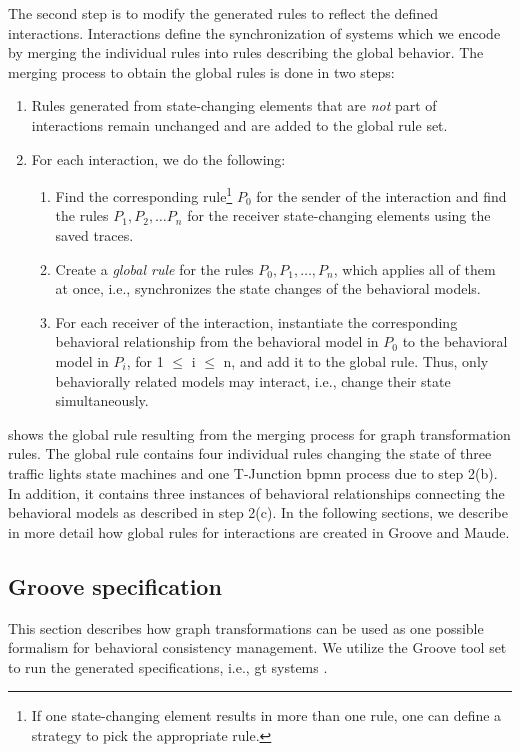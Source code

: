 \documentclass{jot}
\begin{document}
The second step is to modify the generated rules to reflect the defined interactions.
Interactions define the synchronization of systems which we encode by merging the individual rules into rules describing the global behavior.
The merging process to obtain the global rules is done in two steps:

\begin{enumerate}
    \item Rules generated from state-changing elements that are \textit{not} part of interactions remain unchanged and are added to the global rule set.
    \item For each interaction, we do the following:
     \begin{enumerate}
         \item Find the corresponding rule\footnote{If one state-changing element results in more than one rule, one can define a strategy to pick the appropriate rule.} $P_0$ for the sender of the interaction and find the rules $P_1, P_2, \ldots P_n$ for the receiver state-changing elements using the saved traces.
         \item Create a \emph{global rule} for the rules $P_0, P_1, \ldots, P_n$, which applies all of them at once, i.e., synchronizes the state changes of the behavioral models.
         \item For each receiver of the interaction, instantiate the corresponding behavioral relationship from the behavioral model in $P_0$ to the behavioral model in $P_i$, for 1 $\leq$ i $\leq$ n, and add it to the global rule.
         Thus, only behaviorally related models may interact, i.e., change their state simultaneously.
     \end{enumerate}
\end{enumerate}

 shows the global rule resulting from the merging process for graph transformation rules.
The global rule contains four individual rules changing the state of three traffic lights state machines and one T-Junction \gls*{bpmn} process due to step 2(b).
In addition, it contains three instances of behavioral relationships connecting the behavioral models as described in step 2(c). 
In the following sections, we describe in more detail how global rules for interactions are created in Groove and Maude.


\subsection{Groove specification} 
This section describes how graph transformations can be used as one possible formalism for behavioral consistency management.
We utilize the Groove tool set to run the generated specifications, i.e., \gls*{gt} systems \cite{rensinkGROOVESimulatorTool2004}.
\end{document}
